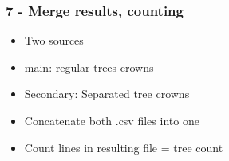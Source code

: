 \documentclass[aspectratio=169]{beamer}
\begin{document}
{
\begin{frame}[plain]
\end{frame}}


\begin{frame}
  \frametitle{7 - Merge results, counting}
\begin{center}
\begin{itemize}
 \item Two sources 
 \item main: regular trees crowns
 \item Secondary: Separated tree crowns
 \item Concatenate both .csv files into one
 \item Count lines in resulting file = tree count 
\end{itemize}
\end{center}
\end{frame}

{
\begin{frame}[plain]
\end{frame}}
\end{document}
